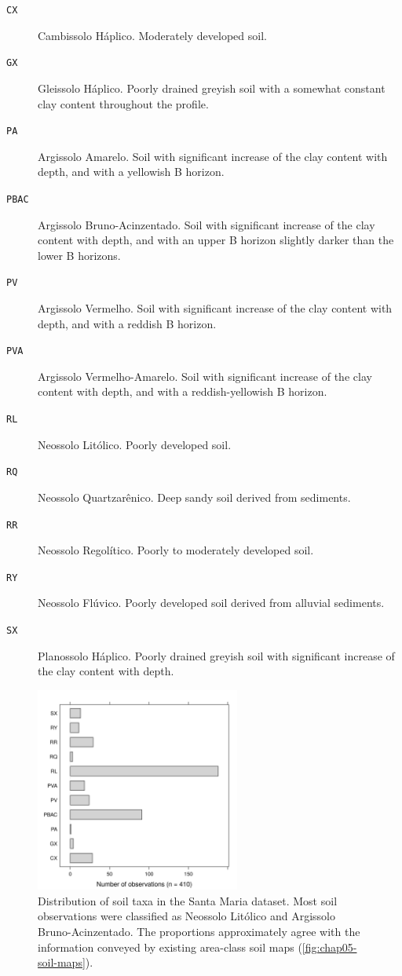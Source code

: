 \begin{description}
\item[\texttt{CX}] Cambissolo Háplico. Moderately developed soil.
\item[\texttt{GX}] Gleissolo Háplico. Poorly drained greyish soil with a somewhat constant clay content 
throughout the profile.
\item[\texttt{PA}] Argissolo Amarelo. Soil with significant increase of the clay content with depth, and with 
a yellowish B horizon.
\item[\texttt{PBAC}] Argissolo Bruno-Acinzentado. Soil with significant increase of the clay content with 
depth, and with an upper B horizon slightly darker than the lower B horizons.
\item[\texttt{PV}] Argissolo Vermelho. Soil with significant increase of the clay content with depth, and with 
a reddish B horizon.
\item[\texttt{PVA}] Argissolo Vermelho-Amarelo. Soil with significant increase of the clay content with depth, 
and with a reddish-yellowish B horizon.
\item[\texttt{RL}] Neossolo Litólico. Poorly developed soil.
\item[\texttt{RQ}] Neossolo Quartzarênico. Deep sandy soil derived from sediments.
\item[\texttt{RR}] Neossolo Regolítico. Poorly to moderately developed soil.
\item[\texttt{RY}] Neossolo Flúvico. Poorly developed soil derived from alluvial sediments.
\item[\texttt{SX}] Planossolo Háplico. Poorly drained greyish soil with significant increase of the clay 
content with depth.
\end{description}

\begin{figure}[!ht]
\centering
\includegraphics[width=0.60\textwidth]{fig/chap04-taxon}
\caption[Distribution of soil taxa in the Santa Maria dataset.]{Distribution of soil taxa in the Santa Maria 
dataset. Most soil observations were classified as Neossolo Litólico and Argissolo Bruno-Acinzentado. The 
proportions approximately agree with the information conveyed by existing area-class soil maps 
(\autoref{fig:chap05-soil-maps}).}
\label{fig:chap04-taxon}
\end{figure}


